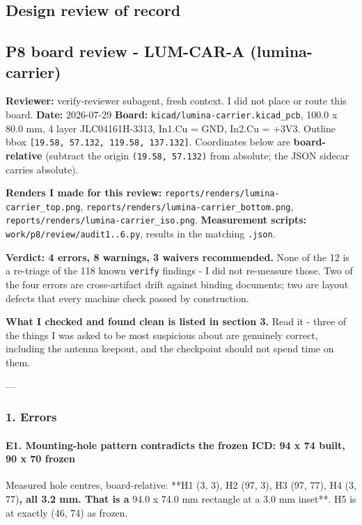 \documentclass[11pt,a4paper]{article}
\begin{document}
\subsection*{Design review of record}
\subsection*{P8 board review - LUM-CAR-A (lumina-carrier)}
\textbf{Reviewer:} verify-reviewer subagent, fresh context. I did not place or route this board. \textbf{Date:} 2026-07-29 \textbf{Board:} \texttt{kicad/lumina-carrier.kicad\_pcb}, 100.0 x 80.0 mm, 4 layer JLC04161H-3313, In1.Cu = GND, In2.Cu = +3V3. Outline bbox \texttt{{[}19.58, 57.132, 119.58, 137.132{]}}. Coordinates below are \textbf{board-relative} (subtract the origin \texttt{(19.58, 57.132)} from absolute; the JSON sidecar carries absolute).

\textbf{Renders I made for this review:} \texttt{reports/renders/lumina-carrier\_top.png}, \texttt{reports/renders/lumina-carrier\_bottom.png}, \texttt{reports/renders/lumina-carrier\_iso.png}. \textbf{Measurement scripts:} \texttt{work/p8/review/audit1..6.py}, results in the matching \texttt{.json}.

\textbf{Verdict: 4 errors, 8 warnings, 3 waivers recommended.} None of the 12 is a re-triage of the 118 known \texttt{verify} findings - I did not re-measure those. Two of the four errors are cross-artifact drift against binding documents; two are layout defects that every machine check passed by construction.

\textbf{What I checked and found clean is listed in section 3.} Read it - three of the things I was asked to be most suspicious about are genuinely correct, including the antenna keepout, and the checkpoint should not spend time on them.

---

\subsubsection*{1. Errors}
\paragraph*{E1. Mounting-hole pattern contradicts the frozen ICD: 94 x 74 built, 90 x 70 frozen}
Measured hole centres, board-relative: {*}{*}H1 (3, 3), H2 (97, 3), H3 (97, 77), H4 (3, 77)\textbf{, all 3.2 mm. That is a }94.0 x 74.0 mm rectangle at a 3.0 mm inset{*}{*}. H5 is at exactly (46, 74) as frozen.
\end{document}

